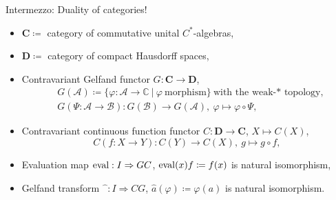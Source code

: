 \begin{frame}{Intermezzo: Duality of categories!}
  \begin{itemize}
    \item $\mathbf{C}\coloneq$ category of commutative unital $C^*$-algebras,
    \item $\mathbf{D} \coloneq$ category of compact Hausdorff spaces,
      \pause
    \item Contravariant Gelfand functor $G: \mathbf{C} \to \mathbf{D}$,
      \begin{equation*}
        \begin{split}
          & G(\mathscr{A}) \coloneq \{ \varphi : \mathscr{A} \to \mathbb{C} \ | \ \varphi \ \text{morphism}\} \ \text{with the weak-* topology}, \\
          & G( \Psi : \mathscr{A} \to \mathscr{B}) : G(\mathscr{B} ) \to G(\mathscr{A}), \ \varphi \mapsto \varphi \circ \Psi,
        \end{split}
    \end{equation*}
    \pause
  \item Contravariant continuous function functor $C: \mathbf{D} \to \mathbf{C}$, $X \mapsto C(X)$, 
    \begin{equation*}
       C(f:X \to Y) : C(Y) \to C(X), \ g \mapsto g \circ f,
    \end{equation*}
    \pause
  \item Evaluation map $\operatorname{eval} : I \Rightarrow GC$, $\operatorname{eval} (x) f\coloneq f(x)$ is natural isomorphism,
  \item Gelfand transform $\widehat{\phantom{a}} : I \Rightarrow CG$, $\widehat{a}(\varphi)\coloneq\varphi (a)$ is natural isomorphism.
      \end{itemize}
      \end{frame}
